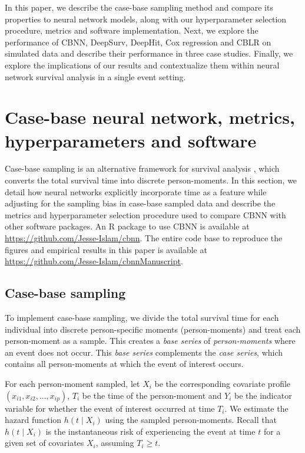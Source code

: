 \documentclass[preprint,12pt,authoryear]{elsarticle}
\begin{document}
In this paper, we describe the case-base sampling method and compare its properties to neural
network models, along with our hyperparameter selection procedure,
metrics and software implementation. Next, we explore the performance of CBNN, DeepSurv,
DeepHit, Cox regression and CBLR on simulated data and
describe their performance in three case studies. Finally, we explore
the implications of our results and contextualize them within neural network survival analysis in a single
event setting.





\hypertarget{methods}{%
\section{Case-base neural network, metrics, hyperparameters and
software}\label{methods}}


Case-base sampling is an alternative framework for survival analysis \citep{hanley2009},
which converts the total survival time into discrete person-moments. In this section, we detail how neural
networks explicitly incorporate time as a feature while adjusting for the sampling bias in case-base
sampled data and describe the metrics and hyperparameter selection procedure used to compare
CBNN with other software packages. An R package to use CBNN is available at
\url{https://github.com/Jesse-Islam/cbnn}. The entire code base to reproduce the figures
and empirical results in this paper is available at \url{https://github.com/Jesse-Islam/cbnnManuscript}.

\hypertarget{case-base-sampling}{%
\subsection{Case-base sampling}\label{case-base-sampling}}

To implement case-base sampling, we divide the total survival time for each individual into discrete person-specific moments (person-moments) and treat each person-moment as a sample. This creates a \emph{base series} of
\emph{person-moments} where an event does not occur. This \emph{base series} complements the \emph{case series}, which contains
all person-moments at which the event of interest occurs.

For each person-moment sampled, let \(X_i\) be the corresponding covariate profile
\(\left(x_{i1},x_{i2},...,x_{ip} \right)\), \(T_i\) be the time of the person-moment and \(Y_i\) be the indicator
variable for whether the event of interest occurred at time \(T_i\). We estimate the hazard function
\(h(t \mid X_i)\) using the sampled person-moments. Recall that \(h(t \mid X_i)\) is the instantaneous
risk of experiencing the event at time \(t\) for a given set of covariates \(X_i\), assuming \(T_i \geq t\).
\end{document}
